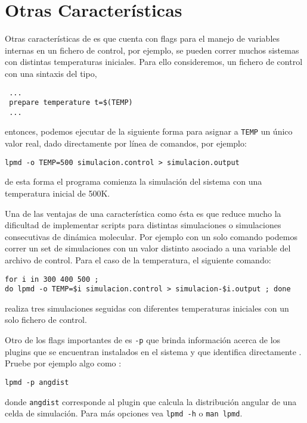 \section{Otras Caracter\'isticas}

Otras caracter\'isticas de {\lpmd} es que cuenta con flags para el manejo de variables internas en un fichero de control, por ejemplo, se pueden correr muchos sistemas con distintas temperaturas iniciales. Para ello consideremos, un fichero de control con una sintaxis del tipo,

\begin{verbatim}
 ...
 prepare temperature t=$(TEMP)
 ...
\end{verbatim}
\noindent
entonces, podemos ejecutar {\lpmd} de la siguiente forma para asignar a \verb|TEMP| un \'unico valor real, dado directamente por l\'inea de comandos, por ejemplo:

\begin{center}
 \texttt{lpmd -o TEMP=500 simulacion.control > simulacion.output}
\end{center}
\noindent
de esta forma el programa comienza la simulaci\'on del sistema con una temperatura inicial de 500K. 

Una de las ventajas de una caracter\'istica como \'esta es que reduce mucho la dificultad de implementar scripts para distintas simulaciones o simulaciones consecutivas de din\'amica molecular. Por ejemplo con un solo comando podemos correr un set de simulaciones con un valor distinto asociado a una variable del archivo de control. Para el caso de la temperatura, el siguiente comando:

\begin{center}
 \texttt{for i in 300 400 500 ; \\do lpmd -o TEMP=\$i simulacion.control > simulacion-\$i.output ; done}
\end{center}
\noindent
realiza tres simulaciones seguidas con diferentes temperaturas iniciales con un solo fichero de control.


Otro de los flags importantes de {\lpmd} es \verb|-p| que brinda informaci\'on acerca de los plugins que se encuentran instalados en el sistema y que identifica directamente {\lpmd}. Pruebe por ejemplo algo como :

\begin{center}
 \texttt{lpmd -p angdist}
\end{center}
\noindent
donde \verb|angdist| corresponde al plugin que calcula la distribuci\'on angular de una celda de simulaci\'on. Para m\'as opciones vea \verb|lpmd -h| o \verb|man lpmd|. 

